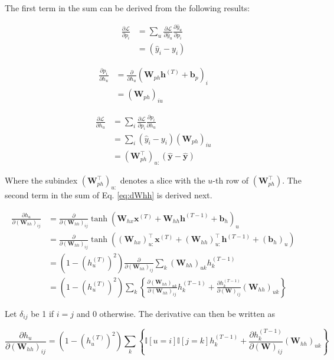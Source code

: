 \documentclass{article}
\newcommand{\pd}[2]{\frac{\partial #1}{\partial #2}}
\begin{document}
The first term in the sum can be derived from the following results:

\begin{align*}
\pd{\mathcal{L}}{p_i} &= \sum_u\pd{\mathcal{L}}{\hat{y}_u}\pd{\hat{y}_u}{p_i} \\
&= (\hat{y}_i - y_i)
\end{align*}

\begin{align*}
\pd{p_i}{h_u} &= \pd{}{h_u}(\mathbf{W}_{ph}\mathbf{h}^{(T)} + \mathbf{b}_p)_i \\
&= (\mathbf{W}_{ph})_{iu}
\end{align*}

\begin{align*}
\pd{\mathcal{L}}{h_u} &= \sum_i\pd{\mathcal{L}}{p_i}\pd{p_i}{h_u} \\
&= \sum_i(\hat{y}_i - y_i)(\mathbf{W}_{ph})_{iu} \\
&= (\mathbf{W}_{ph}^\top)_{u:}(\hat{\mathbf{y}} - \hat{\mathbf{y}})
\end{align*}

Where the subindex $(\mathbf{W}_{ph}^\top)_{u:}$ denotes a slice with the $u$-th row of $(\mathbf{W}_{ph}^\top)$. The second term in the sum of Eq. \ref{eq:dWhh} is derived next.

\begin{align*}
\pd{h_u}{(\mathbf{W}_{hh})_{ij}} &=
\pd{}{(\mathbf{W}_{hh})_{ij}}\tanh(\mathbf{W}_{hx}\mathbf{x}^{(T)} + \mathbf{W}_{hh}\mathbf{h}^{(T-1)} + \mathbf{b}_h)_u \\
&=
\pd{}{(\mathbf{W}_{hh})_{ij}}\tanh((\mathbf{W}_{hx})_{u:}^\top\mathbf{x}^{(T)} + (\mathbf{W}_{hh})_{u:}^\top\mathbf{h}^{(T-1)} + (\mathbf{b}_h)_u) \\
&=
(1 - (h_u^{(T)})^2) \pd{}{(\mathbf{W}_{hh})_{ij}}\sum_k (\mathbf{W}_{hh})_{uk}h^{(T-1)}_k \\
&=
(1 - (h_u^{(T)})^2) \sum_k\left\lbrace \pd{(\mathbf{W}_{hh})_{uk}}{(\mathbf{W}_{hh})_{ij}}h^{(T-1)}_k + \pd{h_k^{(T-1)}}{(\mathbf{W})_{ij}}(\mathbf{W}_{hh})_{uk}\right\rbrace
\end{align*}

Let $\delta_{ij}$ be 1 if $i=j$ and 0 otherwise. The derivative can then be written as

\begin{equation}
\pd{h_u}{(\mathbf{W}_{hh})_{ij}} =
(1 - (h_u^{(T)})^2) \sum_k\left\lbrace \mathbb{I}[u=i]\mathbb{I}[j=k]  h^{(T-1)}_k + \pd{h_k^{(T-1)}}{(\mathbf{W})_{ij}}(\mathbf{W}_{hh})_{uk}\right\rbrace
\label{eq:explode}
\end{equation}
\end{document}

